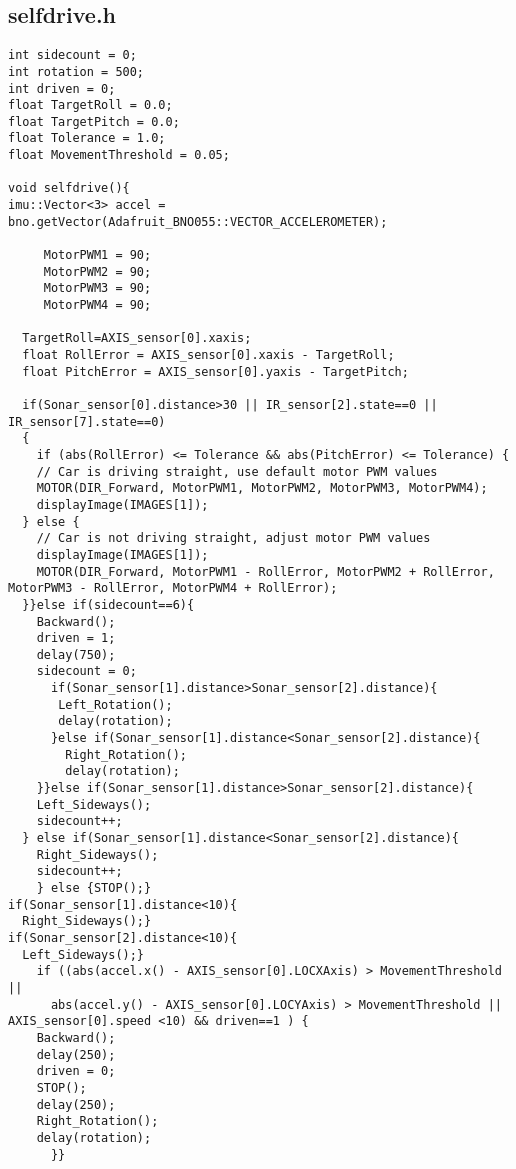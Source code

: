 \subsection{selfdrive.h}
\begin{lstlisting}
int sidecount = 0;
int rotation = 500;
int driven = 0;
float TargetRoll = 0.0;    
float TargetPitch = 0.0;   
float Tolerance = 1.0;
float MovementThreshold = 0.05;   

void selfdrive(){
imu::Vector<3> accel = bno.getVector(Adafruit_BNO055::VECTOR_ACCELEROMETER);

     MotorPWM1 = 90;
     MotorPWM2 = 90;
     MotorPWM3 = 90;
     MotorPWM4 = 90;

  TargetRoll=AXIS_sensor[0].xaxis;
  float RollError = AXIS_sensor[0].xaxis - TargetRoll;
  float PitchError = AXIS_sensor[0].yaxis - TargetPitch;

  if(Sonar_sensor[0].distance>30 || IR_sensor[2].state==0 || IR_sensor[7].state==0)
  {
    if (abs(RollError) <= Tolerance && abs(PitchError) <= Tolerance) {
    // Car is driving straight, use default motor PWM values
    MOTOR(DIR_Forward, MotorPWM1, MotorPWM2, MotorPWM3, MotorPWM4);
    displayImage(IMAGES[1]);
  } else {
    // Car is not driving straight, adjust motor PWM values
    displayImage(IMAGES[1]);
    MOTOR(DIR_Forward, MotorPWM1 - RollError, MotorPWM2 + RollError, MotorPWM3 - RollError, MotorPWM4 + RollError);
  }}else if(sidecount==6){
    Backward(); 
    driven = 1;
    delay(750); 
    sidecount = 0;
      if(Sonar_sensor[1].distance>Sonar_sensor[2].distance){
       Left_Rotation();
       delay(rotation);
      }else if(Sonar_sensor[1].distance<Sonar_sensor[2].distance){
        Right_Rotation();
        delay(rotation);
    }}else if(Sonar_sensor[1].distance>Sonar_sensor[2].distance){
    Left_Sideways();
    sidecount++;
  } else if(Sonar_sensor[1].distance<Sonar_sensor[2].distance){
    Right_Sideways();
    sidecount++;
    } else {STOP();}
if(Sonar_sensor[1].distance<10){
  Right_Sideways();}
if(Sonar_sensor[2].distance<10){
  Left_Sideways();}
    if ((abs(accel.x() - AXIS_sensor[0].LOCXAxis) > MovementThreshold || 
      abs(accel.y() - AXIS_sensor[0].LOCYAxis) > MovementThreshold || AXIS_sensor[0].speed <10) && driven==1 ) {
    Backward(); 
    delay(250);
    driven = 0;
    STOP();
    delay(250);
    Right_Rotation();
    delay(rotation);
      }}
\end{lstlisting}